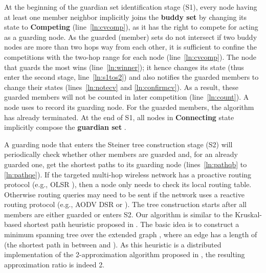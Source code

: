 \documentclass[10pt, conference, compsocconf]{IEEEtran}
\begin{document}
    At the beginning of the guardian set identification stage (S1), every node having at least one member neighbor implicitly joins the \textbf{buddy set}  by changing its state to \textbf{Competing} (line~\ref{ln:cvcomp}), as it has the right to compete for acting as a guarding node. As the guarded (member) sets do not intersect if two buddy nodes are more than two hops way from each other, it is sufficient to confine the competitions with the two-hop range for each node (line~\ref{ln:cvcomp}). The node that guards the most wins (line~\ref{ln:winner}); it hence changes its state (thus enter the second stage, line~\ref{ln:s1tos2}) and also notifies the guarded members to change their states (lines~\ref{ln:notecv} and \ref{ln:confirmcv}). As a result, these guarded members will not be counted in later competition (line~\ref{ln:count}). A node  uses  to record its guarding node. For the guarded members, the algorithm has already terminated. At the end of S1, all nodes in \textbf{Connecting} state implicitly compose the \textbf{guardian set} .

    A guarding node that enters the Steiner tree construction stage (S2) will periodically check whether other members are guarded and, for an already guarded one, get the shortest paths to its guarding node (lines~\ref{ln:pathqb} to \ref{ln:pathqe}). If the targeted multi-hop wireless network has a proactive routing protocol (e.g., OLSR \cite{OSLR}), then a node only needs to check its local routing table. Otherwise routing queries may need to be sent if the network uses a reactive routing protocol (e.g., AODV \cite{AODV} DSR or \cite{DSR}). The tree construction starts after all members are either guarded or enters S2. Our algorithm is similar to the Kruskal-based shortest path heuristic proposed in \cite{Bauer1996}. The basic idea is to construct a minimum spanning tree over the extended graph , where an edge  has a length of  (the shortest path in  between  and ). As this heuristic is a distributed implementation of the 2-approximation algorithm proposed in \cite{Kou1981}, the resulting approximation ratio is indeed 2.
\end{document}
